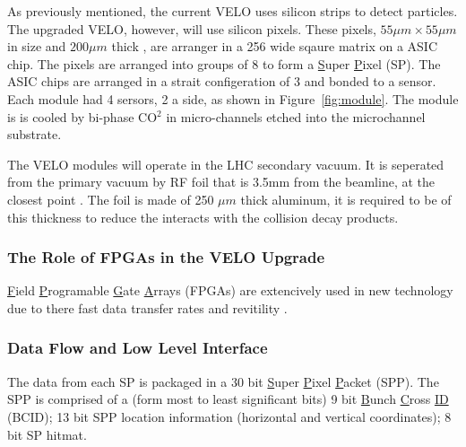       As previously mentioned, the current VELO uses silicon strips to detect particles.
      The upgraded VELO, however, will use silicon pixels.
      These pixels, $55 \mu m \times 55 \mu m$ in size and $200 \mu m$ thick \cite{velo_design_report}, are arranger in a 256 wide sqaure matrix on a ASIC chip.
      The pixels are arranged into groups of 8 to form a \underline{S}uper \underline{P}ixel (SP).
      The ASIC chips are arranged in a strait configeration of 3 and bonded to a sensor.
      Each module had 4 sersors, 2 a side, as shown in Figure~\ref{fig:module}. 
      The module is is cooled by bi-phase CO$^2$ in micro-channels etched into the microchannel substrate.
      \par
      The VELO modules will operate in the LHC secondary vacuum.
      It is seperated from the primary vacuum by RF foil that is 3.5mm from the beamline, at the closest point \cite{velo_design_report}.
      The foil is made of 250 $\mu m$ thick aluminum, it is required to be of this thickness to reduce the interacts with the collision decay products.

      \subsubsection{The Role of FPGAs in the VELO Upgrade}

      \underline{F}ield \underline{P}rogramable \underline{G}ate \underline{A}rrays (FPGAs) are extencively used in new technology due to there fast data transfer rates and revitility \cite{fpga}.

      \subsubsection{Data Flow and Low Level Interface}   

      The data from each SP is packaged in a 30 bit \underline{S}uper \underline{P}ixel \underline{P}acket (SPP). The SPP is comprised of  a (form most to least significant bits) 9 bit \underline{B}unch \underline{C}ross \underline{ID} (BCID); 13 bit SPP location information (horizontal and vertical coordinates); 8 bit SP hitmat.    
